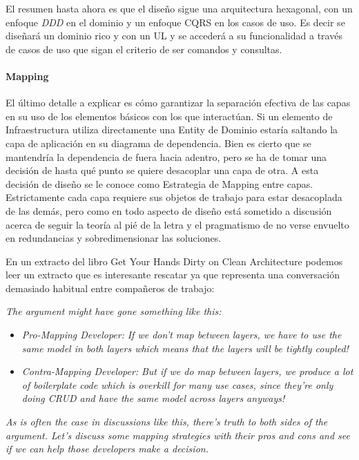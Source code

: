 El resumen hasta ahora es que el diseño sigue una arquitectura hexagonal, con un enfoque \textit{DDD} en el dominio y un enfoque CQRS en los casos de uso.
Es decir se diseñará un dominio rico y con un UL y se accederá a su funcionalidad a través de casos de uso que sigan el criterio de ser comandos y consultas.

\paragraph{Mapping}

El último detalle a explicar es cómo garantizar la separación efectiva de las capas en su uso de los elementos básicos con los que interactúan.
Si un elemento de Infraestructura utiliza directamente una Entity de Dominio estaría saltando la capa de aplicación en su diagrama de dependencia.
Bien es cierto que se mantendría la dependencia de fuera hacia adentro, pero se ha de tomar una decisión de hasta qué punto se quiere desacoplar una capa de otra.
A esta decisión de diseño se le conoce como Estrategia de Mapping entre capas.
Estrictamente cada capa requiere sus objetos de trabajo para estar desacoplada de las demás, pero como en todo aspecto de diseño está sometido a discusión acerca de seguir la teoría al pié de la letra y el pragmatismo de no verse envuelto en redundancias y sobredimensionar las soluciones.

En un extracto del libro Get Your Hands Dirty on Clean Architecture\cite{TomHombergs2019GYHD} podemos leer un extracto que es interesante rescatar ya que representa una conversación demasiado habitual entre compañeros de trabajo:

\textit{ The argument might have gone something like this:}

\begin{itemize}
    \item \textit{Pro-Mapping Developer:}
    \subitem  \textit{ If we don’t map between layers, we have to use the same model in both layers which means that the layers will be tightly coupled!}
    \item \textit{Contra-Mapping Developer:}
    \subitem \textit{ But if we do map between layers, we produce a lot of boilerplate code which is overkill for many use cases, since they’re only doing CRUD and have the same model across layers anyways!}
\end{itemize}
\textit{As is often the case in discussions like this, there’s truth to both sides of the argument. Let’s discuss some mapping strategies with their pros and cons and see if we can help those developers make a decision.}


